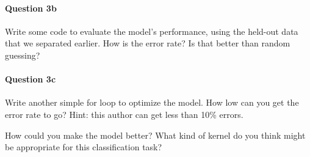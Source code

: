 \documentclass{article}
\begin{document}
\paragraph{Question 3b}
Write some code to evaluate the model's performance, using the held-out data that we separated earlier. How is the error rate? Is that better than random guessing?

\paragraph{Question 3c}
Write another simple for loop to optimize the model. How low can you get the error rate to go? Hint: this author can get less than 10\% errors.

How could you make the model better? What kind of kernel do you think might be appropriate for this classification task?
\end{document}
